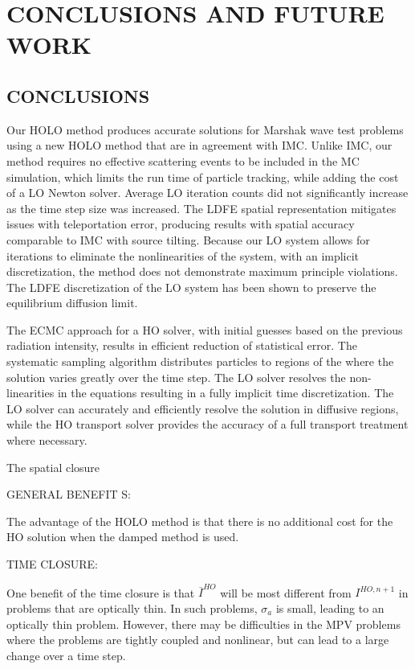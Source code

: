 \chapter{ \uppercase{Conclusions and Future Work} }
\label{chp:conclusions}

\section{CONCLUSIONS}

Our HOLO method produces accurate solutions for Marshak wave test problems using
a new HOLO method that are in agreement with IMC.  Unlike IMC, our method requires no effective scattering
events to be included in the MC simulation, which limits the run time of particle
tracking, while adding the cost of a LO Newton solver. Average LO iteration counts
did not significantly increase as the time step size was increased. The LDFE spatial representation
mitigates issues with teleportation error, producing results with spatial accuracy
comparable to IMC with source tilting.   Because our LO system allows for iterations
to eliminate the nonlinearities of the system, with an implicit discretization, the method does not demonstrate 
maximum principle violations.  The LDFE discretization of the LO system has been shown to preserve the equilibrium
diffusion limit.

 The ECMC approach for a HO solver, with initial guesses based on the
previous radiation intensity, results in efficient reduction of statistical error.  The systematic sampling algorithm
distributes particles to regions of the where the solution varies greatly over the time step.
The LO solver resolves the non-linearities in the equations resulting in a fully
implicit time discretization.
The LO solver
can accurately and efficiently resolve the solution in diffusive regions, while the HO
transport solver provides the accuracy of a full transport treatment where necessary. 

The spatial closure


GENERAL BENEFIT S:

The advantage of the HOLO method is that
there is no additional cost for the HO solution when the damped method is used.

TIME CLOSURE:

One benefit of the time closure is that $\overline I^{HO}$ will be
most different from $I^{HO,n+1}$ in problems that are optically thin.  In such problems,
$\sigma_a$ is small, leading to an optically thin problem.  However, there may be
difficulties in the MPV problems where the problems are tightly coupled and nonlinear, but
can lead to a large change over a time step.  


